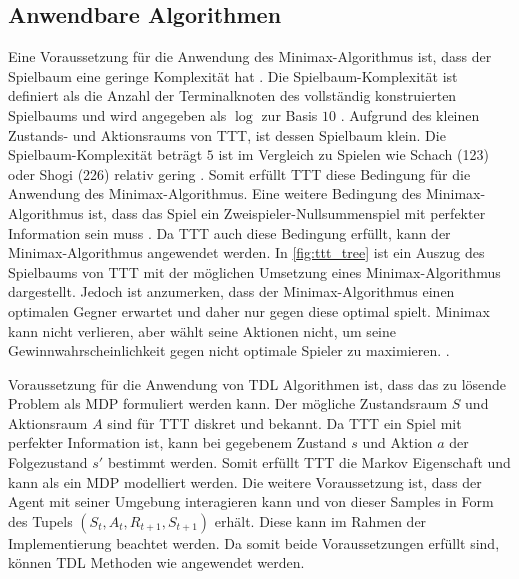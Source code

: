 \subsection{Anwendbare Algorithmen}
\label{sec:anwendbare_algorithmen}
Eine Voraussetzung für die Anwendung des Minimax-Algorithmus ist, dass der Spielbaum eine geringe Komplexität hat \cite[S. 10]{block-berlitzm.ProInformatikFunktionaleProgrammierung2009}.
Die Spielbaum-Komplexität ist definiert als die Anzahl der Terminalknoten des vollständig konstruierten Spielbaums und wird angegeben als $\log$ zur Basis $10$ \cite[S. 160]{allisSearchingSolutionsGames1994}.
Aufgrund des kleinen Zustands- und Aktionsraums von \ac{TTT}, ist dessen Spielbaum klein.
Die Spielbaum-Komplexität beträgt $5$ ist im Vergleich zu Spielen wie Schach (123) oder Shogi (226) relativ gering \cite[S. 11]{block-berlitzm.ProInformatikFunktionaleProgrammierung2009}.
Somit erfüllt \ac{TTT} diese Bedingung für die Anwendung des Minimax-Algorithmus.
Eine weitere Bedingung des Minimax-Algorithmus ist, dass das Spiel ein Zweispieler-Nullsummenspiel mit perfekter Information sein muss \cite[S. 10]{block-berlitzm.ProInformatikFunktionaleProgrammierung2009}. 
Da \ac{TTT} auch diese Bedingung erfüllt, kann der Minimax-Algorithmus angewendet werden.
In \cref{fig:ttt_tree} ist ein Auszug des Spielbaums von \acs{TTT} mit der möglichen Umsetzung eines Minimax-Algorithmus dargestellt. Jedoch ist anzumerken, dass der Minimax-Algorithmus einen optimalen Gegner erwartet und daher nur gegen diese optimal spielt. Minimax kann nicht verlieren, aber wählt seine Aktionen nicht, um seine Gewinnwahrscheinlichkeit gegen nicht optimale Spieler zu maximieren. \cite[S. 8]{suttonLearningPredictMethods1988}. 

Voraussetzung für die Anwendung von \ac{TDL} Algorithmen ist, dass das zu lösende Problem als \ac{MDP} formuliert werden kann.
Der mögliche Zustandsraum $S$ und Aktionsraum $A$ sind für \ac{TTT} diskret und bekannt. 
Da \ac{TTT} ein Spiel mit perfekter Information ist, kann bei gegebenem Zustand $s$ und Aktion $a$ der Folgezustand $s'$ bestimmt werden.
Somit erfüllt \ac{TTT} die Markov Eigenschaft und kann als ein \ac{MDP} modelliert werden.
Die weitere Voraussetzung ist, dass der Agent mit seiner Umgebung interagieren kann und von dieser Samples in Form des Tupels $(S_t,A_t,R_{t+1},S_{t+1})$ erhält. \cite[S. 88]{kontesg.SeminarReinforcementLearning2021}
Diese kann im Rahmen der Implementierung beachtet werden. 
Da somit beide Voraussetzungen erfüllt sind, können \ac{TDL} Methoden wie \bothAlgs angewendet werden.

